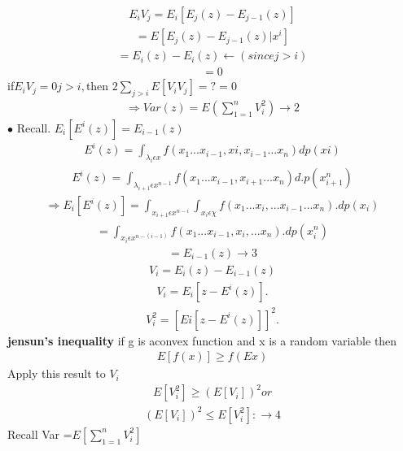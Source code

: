 \documentclass[journal,12pt,twocolumn]{IEEEtran}
\renewcommand\thesection{\arabic{section}}
\begin{document}
\begin{enumerate}[label=\thesection.\arabic*,ref=\thesection.\theenumi]
\begin{align}
E_iV_j=E_i[E_j(z)-E_{j-1}(z)]
\end{align}
\begin{align}
=E[E_j(z)-E_{j-1}(z)|x^i]
\end{align}
\begin{align}
=E_i(z)-E_i(z)\leftarrow(since j>i)
\end{align}
\begin{align}
=0
\end{align}
if$E_i V_j=0 j>i,$then $2\sum_{j>i}E[V_iV_j]=?=0$
\begin{align}
\Rightarrow Var(z)=E(\sum_{1=1}^{n} V_i^2)\rightarrow2
\end{align}
$\bullet$ Recall. $E_i[E^i(z)]=E_{i-1}(z)$
\begin{align}
E^i(z)=\int_{\lambda_i \epsilon x}f(x_1...x_{i-1},xi,x_{i-1}...x_n)dp(xi)
\end{align}
\begin{align}
E^i(z)=\int_{\lambda_{i+1} \epsilon x^{n-1}}f(x_1...x_{i-1},x_{i+1}...x_n)d.p(x_{i+1}^n)
\end{align}
\begin{align}
\Rightarrow E_i[E^i(z)]=\int_{x_{i+1} \epsilon x^{n-i}} \int_{x_i \epsilon \chi}f(x_1...x_i,...x_{i-1}...x_n).dp(x_i)
\end{align}
\begin{align}
=\int_{x_i \epsilon x^{n-(i-1)}}f(x_1...x_{i-1},x_i,...x_n).dp(x_i^n)
\end{align}
\begin{align}
=E_{i-1}(z)\rightarrow 3
\end{align}
\begin{align}
V_i=E_i(z)-E_{i-1}(z)
\end{align}
\begin{align}
V_i=E_i[z-E^i(z)].
\end{align}
\begin{align}
V_i^2=[Ei[z-E^i(z)]]^2.
\end{align}
\textbf{jensun's inequality} if g is aconvex function and x is a random variable then
\begin{align}
E[f(x)] \geqslant f(E{x})
\end{align}
Apply this result to $V_i$
\begin{align}
E[V_i^2] \geqslant (E[V_i])^2 or
\end{align}
\begin{align}
(E[V_i])^2\leqslant E[V_i^2]:\rightarrow 4
\end{align}
 Recall Var =$E[\sum_{1=1}^{n} V_i^2]$
\end{enumerate}
\end{document}
